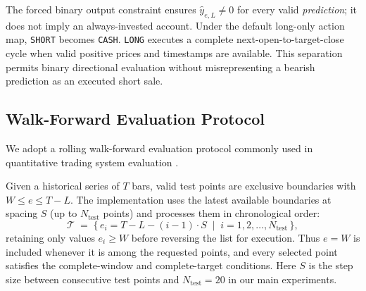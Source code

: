 The forced binary output constraint ensures $\hat{y}_{e,L}\neq 0$ for every
valid \emph{prediction}; it does not imply an always-invested account. Under
the default long-only action map, \texttt{SHORT} becomes \texttt{CASH}.
\texttt{LONG} executes a complete next-open-to-target-close cycle when valid
positive prices and timestamps are available. This separation permits binary
directional evaluation without misrepresenting a bearish prediction as an
executed short sale.

\subsection{Walk-Forward Evaluation Protocol}

We adopt a rolling walk-forward evaluation protocol commonly used in quantitative trading system evaluation \cite{pardo2008evaluation}.

Given a historical series of $T$ bars, valid test points are exclusive
boundaries with $W\leq e\leq T-L$.  The implementation uses the latest
available boundaries at spacing $S$ (up to $N_{\mathrm{test}}$ points) and
processes them in chronological order:
\begin{equation}
    \mathcal{T} \;=\;
    \bigl\{\, e_i = T-L-(i-1)\cdot S
    \;\mid\; i = 1, 2, \ldots, N_{\mathrm{test}} \,\bigr\},
    \label{eq:testpoints}
\end{equation}
retaining only values $e_i\geq W$ before reversing the list for execution.
Thus $e=W$ is included whenever it is among the requested points, and every
selected point satisfies the complete-window and complete-target conditions.
Here $S$ is the step size between consecutive test points and
$N_{\mathrm{test}} = 20$ in our main experiments.

